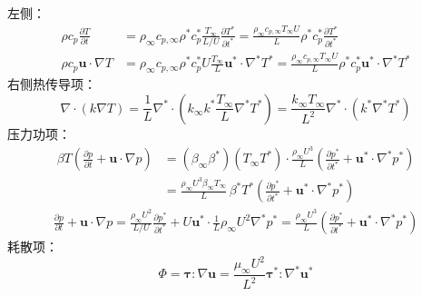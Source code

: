 \begin{derivative}

    左侧：
\begin{align*}
    \rho c_p \frac{\partial T}{\partial t} &= \rho_\infty c_{p,\infty} \rho^* c_p^* \frac{T_\infty}{L/U} \frac{\partial T^*}{\partial t^*} 
    = \frac{\rho_\infty c_{p,\infty} T_\infty U}{L} \rho^* c_p^* \frac{\partial T^*}{\partial t^*} \\
    \rho c_p \mathbf{u}\cdot\nabla T &= \rho_\infty c_{p,\infty} \rho^* c_p^* U \frac{T_\infty}{L} \mathbf{u}^* \cdot \nabla^* T^*
    = \frac{\rho_\infty c_{p,\infty} T_\infty U}{L} \rho^* c_p^* \mathbf{u}^* \cdot \nabla^* T^* 
\end{align*}
右侧热传导项：
\begin{equation*}
    \nabla \cdot (k \nabla T) = \frac{1}{L} \nabla^* \cdot \left( k_\infty k^* \frac{T_\infty}{L} \nabla^* T^* \right) 
    = \frac{k_\infty T_\infty}{L^2} \nabla^* \cdot (k^* \nabla^* T^*) 
\end{equation*}
压力功项：
\begin{align*}
    \beta T \left( \frac{\partial p}{\partial t} + \mathbf{u}\cdot\nabla p \right) 
    &= (\beta_\infty \beta^*) (T_\infty T^*) \cdot \frac{\rho_\infty U^3}{L} \left( \frac{\partial p^*}{\partial t^*} + \mathbf{u}^* \cdot \nabla^* p^* \right) 
    \\&= \frac{\rho_\infty U^3 \beta_\infty T_\infty}{L} \, \beta^* T^* \left( \frac{\partial p^*}{\partial t^*} + \mathbf{u}^* \cdot \nabla^* p^* \right)
\end{align*}
\begin{align*}
    \frac{\partial p}{\partial t} + \mathbf{u}\cdot\nabla p 
    = \frac{\rho_\infty U^2}{L/U} \frac{\partial p^*}{\partial t^*} + U \mathbf{u}^* \cdot \frac{1}{L} \rho_\infty U^2 \nabla^* p^* 
    = \frac{\rho_\infty U^3}{L} \left( \frac{\partial p^*}{\partial t^*} + \mathbf{u}^* \cdot \nabla^* p^* \right) 
\end{align*}
耗散项：
\begin{equation*}
    \Phi = \boldsymbol{\tau} : \nabla \mathbf{u} = \frac{\mu_\infty U^2}{L^2} \boldsymbol{\tau}^* : \nabla^* \mathbf{u}^* 
\end{equation*}
\end{derivative}



